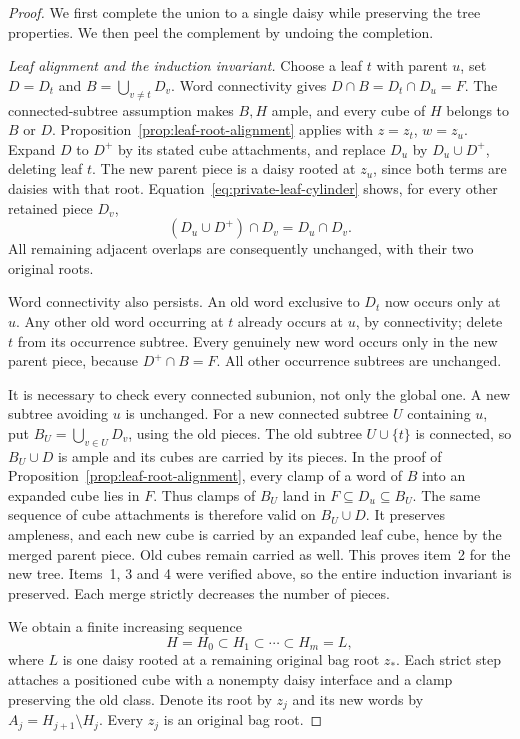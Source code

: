 \documentclass[11pt]{article}
\theoremstyle{definition}
\begin{document}
\begin{proof}
We first complete the union to a single daisy while preserving the tree
properties. We then peel the complement by undoing the completion.

\emph{Leaf alignment and the induction invariant.}
Choose a leaf $t$ with parent $u$, set $D=D_t$ and
$B=\bigcup_{v\ne t}D_v$. Word connectivity gives
$D\cap B=D_t\cap D_u=F$. The connected-subtree assumption makes
$B,H$ ample, and every cube of $H$ belongs to $B$ or $D$.
Proposition~\ref{prop:leaf-root-alignment} applies with
$z=z_t$, $w=z_u$. Expand $D$ to $D^+$ by its stated cube attachments,
and replace $D_u$ by $D_u\cup D^+$, deleting leaf $t$.
The new parent piece is a daisy rooted at $z_u$, since both terms
are daisies with that root. Equation~\eqref{eq:private-leaf-cylinder}
shows, for every other retained piece $D_v$,
\[
 (D_u\cup D^+)\cap D_v=D_u\cap D_v.
\]
All remaining adjacent overlaps are consequently unchanged, with
their two original roots.

Word connectivity also persists. An old word exclusive to $D_t$
now occurs only at $u$. Any other old word occurring at $t$ already
occurs at $u$, by connectivity; delete $t$ from its occurrence subtree.
Every genuinely new word occurs only in the new parent piece, because
$D^+\cap B=F$. All other occurrence subtrees are unchanged.

It is necessary to check every connected subunion, not only the global
one. A new subtree avoiding $u$ is unchanged. For a new connected
subtree $U$ containing $u$, put $B_U=\bigcup_{v\in U}D_v$, using the
old pieces. The old subtree $U\cup\{t\}$ is connected, so
$B_U\cup D$ is ample and its cubes are carried by its pieces.
In the proof of Proposition~\ref{prop:leaf-root-alignment}, every
clamp of a word of $B$ into an expanded cube lies in $F$.
Thus clamps of $B_U$ land in $F\subseteq D_u\subseteq B_U$.
The same sequence of cube attachments is therefore valid on
$B_U\cup D$. It preserves ampleness, and each new cube is carried
by an expanded leaf cube, hence by the merged parent piece.
Old cubes remain carried as well. This proves item~2 for the new tree.
Items~1, 3 and 4 were verified above, so the entire induction invariant
is preserved. Each merge strictly decreases the number of pieces.

We obtain a finite increasing sequence
\begin{equation}\label{eq:tree-completion-chain}
 H=H_0\subset H_1\subset\cdots\subset H_m=L,
\end{equation}
where $L$ is one daisy rooted at a remaining original bag root $z_*$.
Each strict step attaches a positioned cube with a nonempty daisy
interface and a clamp preserving the old class. Denote its root by
$z_j$ and its new words by $A_j=H_{j+1}\setminus H_j$.
Every $z_j$ is an original bag root.


\end{proof}
\end{document}
